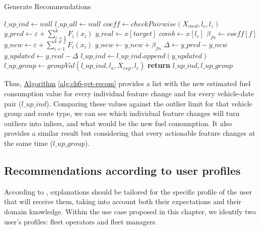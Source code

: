 \begin{algorithm}[h!]
\caption{Generate Recommendations}\label{alg:ch6-get-recom}
\begin{algorithmic}[1]
    \State $l\_up\_ind \gets null$
    \State $l\_up\_all \gets null$
    \State $coeff \gets checkPairwise(X_{med}, l_c, l_z)$
        \State $y\_pred \gets \varepsilon + \sum_{i=1}^{k}  F_{i}(x_{i}) $
        \State $y\_real \gets x[target]$
        \State $comb \gets x[l_c]$
            \State $\beta_{fn} \gets coeff[f]$
            \State $y\_new \gets \varepsilon + \sum_{i=1}^{k \neq f}  F_{i}(x_{i})$
            \State $y\_new \gets y\_new + \beta_{fn}$
            \State $\Delta \gets y\_pred - y\_new$
            \State $y\_updated \gets y\_real - \Delta$
            \State $l\_up\_ind \gets l\_up\_ind.append(y\_updated)$
        \EndFor
    \EndFor
    \State $l\_up\_group \gets groupVal(l\_up\_ind, l_a, X_{exp}, l_c)$
    \State \textbf{return} $l\_up\_ind, l\_up\_group$
\EndProcedure
\end{algorithmic}
\end{algorithm}

Thus, \hyperref[alg:ch6-get-recom]{Algorithm} \ref{alg:ch6-get-recom} provides a list with the new estimated fuel consumption value for every individual feature change and for every vehicle-date pair ($l\_up\_ind$). Comparing these values against the outlier limit for that vehicle group and route type, we can see which individual feature changes will turn outliers into inliers, and what would be the new fuel consumption. It also provides a similar result but considering that every actionable feature changes at the same time ($l\_up\_group$). 


\subsection{Recommendations according to user profiles}\label{subsec:ch6-recomm-user-profiles}
According to \parencite{arrieta2020explainable}, explanations should be tailored for the specific profile of the user that will receive them, taking into account both their expectations and their domain knowledge. Within the use case proposed in this chapter, we identify two user's profiles: fleet operators and fleet managers.

